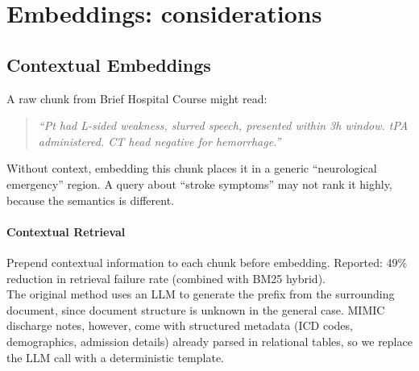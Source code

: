 \documentclass[11pt,a4paper]{article}
\begin{document}
\section{Embeddings: considerations}
\label{sec:embeddings-sec}

\subsection{Contextual Embeddings}

A raw chunk from Brief Hospital Course might read:
\begin{quote}
	\small
	\emph{``Pt had L-sided weakness, slurred speech, presented within 3h
		window.  tPA administered.  CT head negative for hemorrhage.''}
\end{quote}

Without context, embedding this chunk places it in a generic ``neurological emergency'' region.  A query about ``stroke symptoms'' may not rank it highly, because the semantics is different.

\paragraph{Contextual Retrieval~\cite{anthropic2024contextual}}
Prepend contextual information to each chunk before embedding. Reported: 49\% reduction in retrieval failure rate (combined with BM25 hybrid).\\
The original method uses an LLM to generate the prefix from the surrounding document, since document structure is unknown in the general case.  MIMIC discharge notes, however, come with structured metadata (ICD codes, demographics, admission details) already parsed in relational tables, so we replace the LLM call with a deterministic template.

\end{document}
